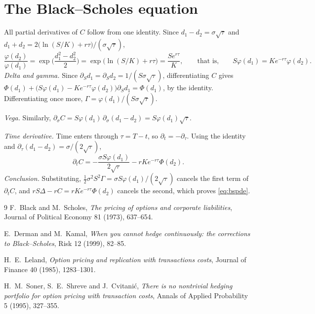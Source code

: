 \documentclass[11pt,a4paper]{article}
\begin{document}
\section{The Black--Scholes equation}\label{app:pde}

All partial derivatives of $C$ follow from one identity. Since $d_1 - d_2 = \sigma\sqrt\tau$ and $d_1 + d_2 = 2\big(\ln(S/K) + r\tau\big)/(\sigma\sqrt\tau)$,
\[
  \frac{\varphi(d_2)}{\varphi(d_1)} = \exp\!\Big(\frac{d_1^2 - d_2^2}{2}\Big) = \exp\!\big(\ln(S/K) + r\tau\big) = \frac{S e^{r\tau}}{K},
  \qquad\text{that is,}\qquad S\varphi(d_1) = K e^{-r\tau}\varphi(d_2).
\]
\emph{Delta and gamma.} Since $\partial_S d_1 = \partial_S d_2 = 1/(S\sigma\sqrt\tau)$, differentiating $C$ gives $\Phi(d_1) + \big(S\varphi(d_1) - Ke^{-r\tau}\varphi(d_2)\big)\partial_S d_1 = \Phi(d_1)$, by the identity. Differentiating once more, $\Gamma = \varphi(d_1)/(S\sigma\sqrt\tau)$.

\emph{Vega.} Similarly, $\partial_\sigma C = S\varphi(d_1)\,\partial_\sigma(d_1 - d_2) = S\varphi(d_1)\sqrt\tau$.

\emph{Time derivative.} Time enters through $\tau = T-t$, so $\partial_t = -\partial_\tau$. Using the identity and $\partial_\tau(d_1 - d_2) = \sigma/(2\sqrt\tau)$,
\[
  \partial_t C = -\frac{\sigma S\varphi(d_1)}{2\sqrt\tau} - rKe^{-r\tau}\Phi(d_2).
\]
\emph{Conclusion.} Substituting, $\tfrac12\sigma^2S^2\Gamma = \sigma S\varphi(d_1)/(2\sqrt\tau)$ cancels the first term of $\partial_t C$, and $rS\Delta - rC = rKe^{-r\tau}\Phi(d_2)$ cancels the second, which proves \eqref{eq:bspde}.

\begin{thebibliography}{9}
\small
{}
F.~Black and M.~Scholes, \emph{The pricing of options and corporate liabilities}, Journal of Political Economy 81 (1973), 637--654.

E.~Derman and M.~Kamal, \emph{When you cannot hedge continuously: the corrections to Black--Scholes}, Risk 12 (1999), 82--85.

H.~E.~Leland, \emph{Option pricing and replication with transactions costs}, Journal of Finance 40 (1985), 1283--1301.

H.~M.~Soner, S.~E.~Shreve and J.~Cvitanić, \emph{There is no nontrivial hedging portfolio for option pricing with transaction costs}, Annals of Applied Probability 5 (1995), 327--355.
\end{thebibliography}
\end{document}
